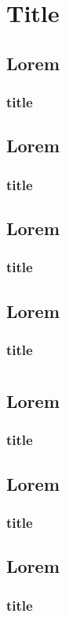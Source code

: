 \documentclass[11pt,a4paper]{report}
\begin{document}
\chapter{Title}
	\section{Lorem}
	\subsection{title}

		\section{Lorem}
	\subsection{title}
	
		\section{Lorem}
	\subsection{title}
	
		\section{Lorem}
	\subsection{title}
	
		\setcounter{chapter}{1}
	\chapter{}
	
		\section{Lorem}
	\subsection{title}
	
		\section{Lorem}
	\subsection{title}
	
		\section{Lorem}
	\subsection{title}
	
	
\end{document}
